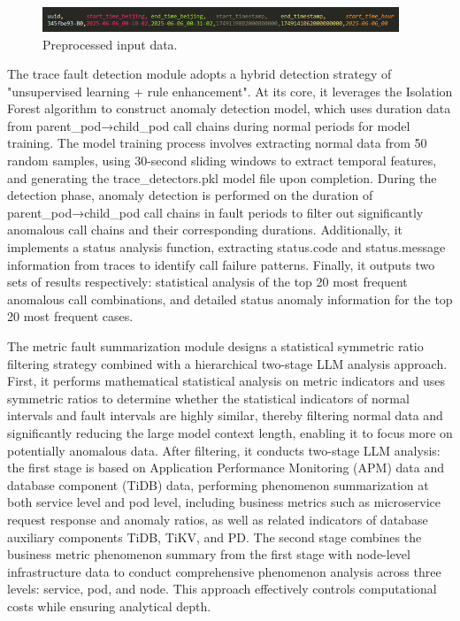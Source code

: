 \documentclass[10pt]{article}
\begin{document}
\begin{figure}[htbp]
    \centering
    \includegraphics[width=0.95\textwidth]{fig3.png}
    \caption{Preprocessed input data.}
    \label{fig3}
\end{figure}

The trace fault detection module adopts a hybrid detection strategy of "unsupervised learning + rule enhancement". At its core, it leverages the Isolation Forest\cite{liu2008isolation} algorithm to construct anomaly detection model, which uses duration data from parent\_pod→child\_pod call chains during normal periods for model training. The model training process involves extracting normal data from 50 random samples, using 30-second sliding windows to extract temporal features, and generating the trace\_detectors.pkl model file upon completion. During the detection phase, anomaly detection is performed on the duration of parent\_pod→child\_pod call chains in fault periods to filter out significantly anomalous call chains and their corresponding durations. Additionally, it implements a status analysis function, extracting status.code and status.message information from traces to identify call failure patterns. Finally, it outputs two sets of results respectively: statistical analysis of the top 20 most frequent anomalous call combinations, and detailed status anomaly information for the top 20 most frequent cases.

The metric fault summarization module designs a statistical symmetric ratio filtering strategy combined with a hierarchical two-stage LLM analysis approach. First, it performs mathematical statistical analysis on metric indicators and uses symmetric ratios to determine whether the statistical indicators of normal intervals and fault intervals are highly similar, thereby filtering normal data and significantly reducing the large model context length, enabling it to focus more on potentially anomalous data. After filtering, it conducts two-stage LLM analysis: the first stage is based on Application Performance Monitoring (APM) data and database component (TiDB) data, performing phenomenon summarization at both service level and pod level, including business metrics such as microservice request response and anomaly ratios, as well as related indicators of database auxiliary components TiDB, TiKV, and PD. The second stage combines the business metric phenomenon summary from the first stage with node-level infrastructure data to conduct comprehensive phenomenon analysis across three levels: service, pod, and node. This approach effectively controls computational costs while ensuring analytical depth.
\end{document}
